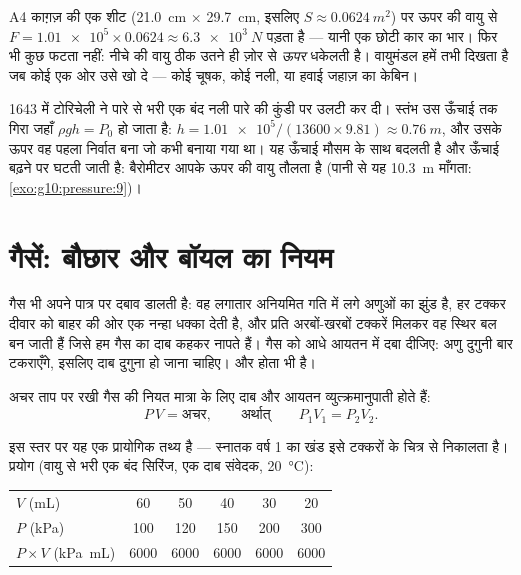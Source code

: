 \begin{example}[अदृश्य बोझ]\label{ex:g10:pressure:sheet}
A4 काग़ज़ की एक शीट (\qty{21.0}{cm} $\times$ \qty{29.7}{cm}, इसलिए $S \approx \qty{0.0624}{m^2}$) पर ऊपर की वायु
से $F = \num{1.01e5} \times 0.0624 \approx \qty{6.3e3}{N}$ पड़ता है --- यानी एक छोटी कार का भार। फिर भी कुछ
फटता नहीं: नीचे की वायु ठीक उतने ही ज़ोर से \emph{ऊपर} धकेलती है।
वायुमंडल हमें तभी दिखता है जब कोई एक ओर उसे खो दे --- कोई चूषक, कोई
नली, या हवाई जहाज़ का केबिन।
\end{example}

\begin{remark}[टोरिचेली का बैरोमीटर]\label{rem:g10:pressure:torricelli}
1643 में टोरिचेली ने पारे से भरी एक बंद नली पारे की कुंडी पर उलटी कर
दी। स्तंभ उस ऊँचाई तक गिरा जहाँ $\rho g h = P_0$ हो जाता है: $h = \num{1.01e5}/(13600 \times 9.81) \approx \qty{0.76}{m}$, और उसके ऊपर
वह पहला निर्वात बना जो कभी बनाया गया था। यह ऊँचाई मौसम के साथ बदलती है
और ऊँचाई बढ़ने पर घटती जाती है: बैरोमीटर आपके ऊपर की वायु तौलता है
(पानी से यह \qty{10.3}{m} माँगता: \cref{exo:g10:pressure:9})।
\end{remark}

\section{गैसें: बौछार और बॉयल का नियम}

गैस भी अपने पात्र पर दबाव डालती है: वह लगातार अनियमित गति में लगे
अणुओं का झुंड है, हर टक्कर दीवार को बाहर की ओर एक नन्हा धक्का देती है,
और प्रति  अरबों-खरबों टक्करें मिलकर वह स्थिर बल बन जाती
हैं जिसे हम गैस का दाब कहकर नापते हैं। गैस को आधे आयतन में दबा
दीजिए: अणु दुगुनी बार टकराएँगे, इसलिए दाब दुगुना हो जाना
चाहिए। और होता भी है।

\begin{proposition}[बॉयल का नियम]\label{prop:g10:pressure:boyle}
अचर ताप पर रखी गैस की नियत मात्रा के लिए दाब और आयतन
व्युत्क्रमानुपाती होते हैं:
\[
P \, V = \text{अचर},
\qquad\text{अर्थात्}\qquad
P_1 V_1 = P_2 V_2 .
\]
\end{proposition}
\admitted

\begin{remark}
इस स्तर पर यह एक प्रायोगिक तथ्य है --- स्नातक वर्ष 1 का खंड इसे टक्करों
के चित्र से निकालता है। प्रयोग (वायु से भरी एक बंद सिरिंज, एक
दाब संवेदक, \qty{20}{\degreeCelsius}):
\begin{center}
\begin{tabular}{lccccc}
$V$ (\unit{mL}) & 60 & 50 & 40 & 30 & 20 \\
$P$ (\unit{kPa}) & 100 & 120 & 150 & 200 & 300 \\
$P \times V$ (\unit{kPa.mL}) & 6000 & 6000 & 6000 & 6000 & 6000
\end{tabular}
\end{center}
\end{remark}

